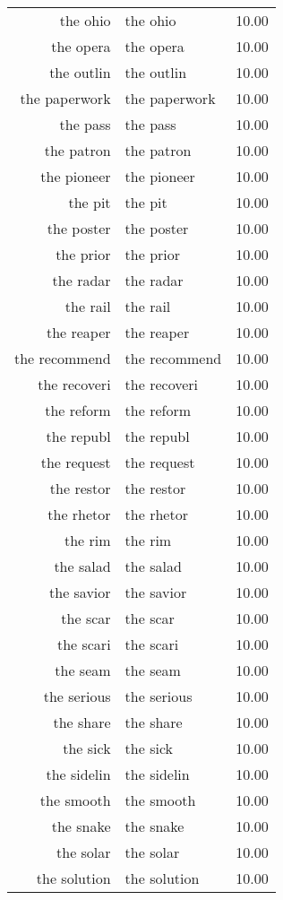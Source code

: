 \begin{table}[ht]
\begin{tabular}{rlr}
  the ohio & the ohio & 10.00 \\ 
  the opera & the opera & 10.00 \\ 
  the outlin & the outlin & 10.00 \\ 
  the paperwork & the paperwork & 10.00 \\ 
  the pass & the pass & 10.00 \\ 
  the patron & the patron & 10.00 \\ 
  the pioneer & the pioneer & 10.00 \\ 
  the pit & the pit & 10.00 \\ 
  the poster & the poster & 10.00 \\ 
  the prior & the prior & 10.00 \\ 
  the radar & the radar & 10.00 \\ 
  the rail & the rail & 10.00 \\ 
  the reaper & the reaper & 10.00 \\ 
  the recommend & the recommend & 10.00 \\ 
  the recoveri & the recoveri & 10.00 \\ 
  the reform & the reform & 10.00 \\ 
  the republ & the republ & 10.00 \\ 
  the request & the request & 10.00 \\ 
  the restor & the restor & 10.00 \\ 
  the rhetor & the rhetor & 10.00 \\ 
  the rim & the rim & 10.00 \\ 
  the salad & the salad & 10.00 \\ 
  the savior & the savior & 10.00 \\ 
  the scar & the scar & 10.00 \\ 
  the scari & the scari & 10.00 \\ 
  the seam & the seam & 10.00 \\ 
  the serious & the serious & 10.00 \\ 
  the share & the share & 10.00 \\ 
  the sick & the sick & 10.00 \\ 
  the sidelin & the sidelin & 10.00 \\ 
  the smooth & the smooth & 10.00 \\ 
  the snake & the snake & 10.00 \\ 
  the solar & the solar & 10.00 \\ 
  the solution & the solution & 10.00 \\ 

\end{tabular}
\end{table}

